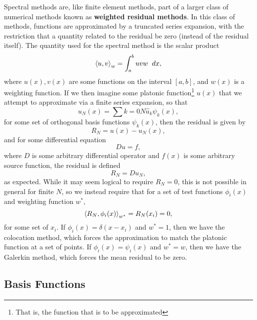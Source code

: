 Spectral methods are, like finite element methods, part of a larger class of numerical methods known as {\bf weighted residual methods}. In this class of methods, functions are approximated by a truncated series expansion, with the restriction that a quantity related to the residual be zero (instead of the residual itself). The quantity used for the spectral method is the scalar product 
\begin{equation}\label{eq:scalarProduct}
\scprod{u}{v}{w} = \int{a}{b}{uvw}{dx},
\end{equation}
where  $u(x),v(x)$ are some functions on the interval $[a,b]$, and $w(x)$ is a weighting function. If we then imagine some platonic function\footnote{That is, the function that is to be approximated} $u(x)$ that we attempt to approximate via a finite series expansion, so that
\begin{equation}\label{eq:seriesExpansion}
u_N(x) = \sum{k=0}{N}{\hat{u}_k \psi_k(x)},
\end{equation}
for some set of orthogonal basis functions $\psi_k(x)$, then the residual is given by
\begin{equation}
R_N = u(x)-u_N(x),
\end{equation} 
and for some differential equation
\begin{equation}
Du = f,
\end{equation}
where $D$ is some arbitrary differential operator and $f(x)$ is some arbitrary source function, the residual is defined
\begin{equation}
R_N = Du_N,
\end{equation}
as expected. While it may seem logical to require $R_N = 0$, this is not possible in general for finite $N$, so we instead require that for a set of test functions $\phi_i(x)$ and weighting function $w^*$, 
\begin{equation}
\left < R_N,\phi_i(x) \right >_{w^*} = R_N(x_i) = 0,
\end{equation}
for some set of $x_i$. If $\phi_i(x) = \delta(x-x_i)$ and $w^* = 1$, then we have the colocation method, which forces the approximation to match the platonic function at a set of points. If $\phi_i(x) = \psi_i(x)$ and $w^* = w$, then we have the Galerkin method, which forces the mean residual to be zero. 

\subsection{Basis Functions}

